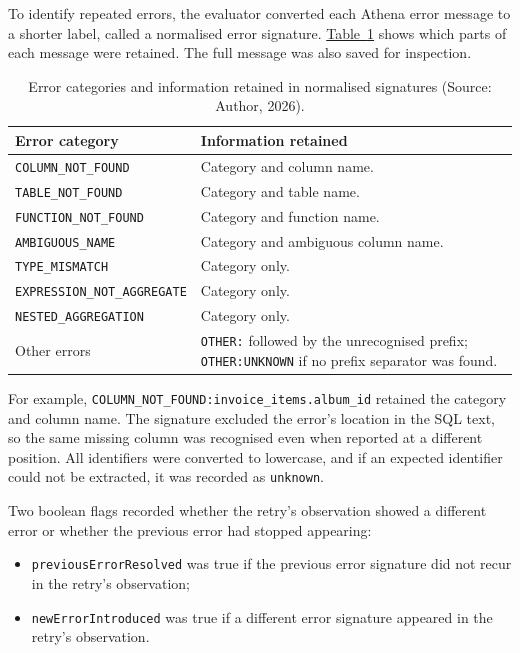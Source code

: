 To identify repeated errors, the evaluator converted each Athena error message
to a shorter label, called a normalised error signature.
\hyperref[tab:error-signatures]{Table~\ref*{tab:error-signatures}} shows which
parts of each message were retained. The full message was also saved for inspection.

\begin{table}[H]
\centering
{\small
\begin{tabularx}{\textwidth}{@{}l>{\raggedright\arraybackslash}X@{}}
\toprule
\textbf{Error category} & \textbf{Information retained} \\
\midrule
\texttt{COLUMN\_NOT\_FOUND} & Category and column name. \\
\addlinespace[0.4em]
\texttt{TABLE\_NOT\_FOUND} & Category and table name. \\
\addlinespace[0.4em]
\texttt{FUNCTION\_NOT\_FOUND} & Category and function name. \\
\addlinespace[0.4em]
\texttt{AMBIGUOUS\_NAME} & Category and ambiguous column name. \\
\addlinespace[0.4em]
\texttt{TYPE\_MISMATCH} & Category only. \\
\addlinespace[0.4em]
\texttt{EXPRESSION\_NOT\_AGGREGATE} & Category only. \\
\addlinespace[0.4em]
\texttt{NESTED\_AGGREGATION} & Category only. \\
\addlinespace[0.4em]
Other errors & \texttt{OTHER:} followed by the unrecognised prefix;
\texttt{OTHER:UNKNOWN} if no prefix separator was found. \\
\bottomrule
\end{tabularx}
}
\caption{Error categories and information retained in normalised signatures
(Source: Author, 2026).}
\label{tab:error-signatures}
\end{table}

For example, \texttt{COLUMN\_NOT\_FOUND:}\allowbreak\texttt{invoice\_items.album\_id}
retained the category and column name. 
The signature excluded the error's location in the SQL text, so the same
missing column was recognised even when reported at a different position.
All identifiers were converted to lowercase,
and if an expected identifier could not
be extracted, it was recorded as \texttt{unknown}.

Two boolean flags recorded whether the retry's observation
showed a different error or whether the previous error had stopped appearing:

\begin{itemize}
    \item \texttt{previousErrorResolved} was true if the previous error
    signature did not recur in the retry's observation;

    \item \texttt{newErrorIntroduced} was true if a different error
    signature appeared in the retry's observation.
\end{itemize}

